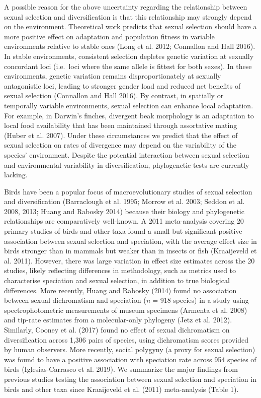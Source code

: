 \documentclass[]{article}
\begin{document}
A possible reason for the above uncertainty regarding the relationship
between sexual selection and diversification is that this relationship
may strongly depend on the environment. Theoretical work predicts that
sexual selection should have a more positive effect on adaptation and
population fitness in variable environments relative to stable ones
(Long et al. 2012; Connallon and Hall 2016). In stable environments,
consistent selection depletes genetic variation at sexually concordant
loci (i.e.~loci where the same allele is fittest for both sexes). In
these environments, genetic variation remains disproportionately at
sexually antagonistic loci, leading to stronger gender load and reduced
net benefits of sexual selection (Connallon and Hall 2016). By contrast,
in spatially or temporally variable environments, sexual selection can
enhance local adaptation. For example, in Darwin's finches, divergent
beak morphology is an adaptation to local food availability that has
been maintained through assortative mating (Huber et al. 2007). Under
these circumstances we predict that the effect of sexual selection on
rates of divergence may depend on the variability of the species'
environment. Despite the potential interaction between sexual selection
and environmental variability in diversification, phylogenetic tests are
currently lacking.

Birds have been a popular focus of macroevolutionary studies of sexual
selection and diversification (Barraclough et al. 1995; Morrow et al.
2003; Seddon et al. 2008, 2013; Huang and Rabosky 2014) because their
biology and phylogenetic relationships are comparatively well-known. A
2011 meta-analysis covering 20 primary studies of birds and other taxa
found a small but significant positive association between sexual
selection and speciation, with the average effect size in birds stronger
than in mammals but weaker than in insects or fish (Kraaijeveld et al.
2011). However, there was large variation in effect size estimates
across the 20 studies, likely reflecting differences in methodology,
such as metrics used to characterise speciation and sexual selection, in
addition to true biological differences. More recently, Huang and
Rabosky (2014) found no association between sexual dichromatism and
speciation (\emph{n} = 918 species) in a study using spectrophotometric
measurements of museum specimens (Armenta et al. 2008) and tip-rate
estimates from a molecular-only phylogeny (Jetz et al. 2012). Similarly,
Cooney et al. (2017) found no effect of sexual dichromatism on
diversification across 1,306 pairs of species, using dichromatism scores
provided by human observers. More recently, social polygyny (a proxy for
sexual selection) was found to have a positive association with
speciation rate across 954 species of birds (Iglesias-Carrasco et al.
2019). We summarize the major findings from previous studies testing the
association between sexual selection and speciation in birds and other
taxa since Kraaijeveld et al. (2011) meta-analysis (Table 1).
\end{document}
